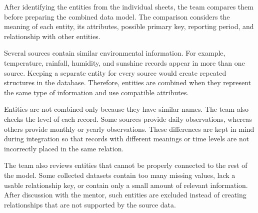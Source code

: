 \label{subsec:entity-integration}

After identifying the entities from the individual sheets, the team compares
them before preparing the combined data model. The comparison considers the
meaning of each entity, its attributes, possible primary key, reporting period,
and relationship with other entities.

Several sources contain similar environmental information. For example,
temperature, rainfall, humidity, and sunshine records appear in more than one
source. Keeping a separate entity for every source would create repeated
structures in the database. Therefore, entities are combined when they
represent the same type of information and use compatible attributes.

Entities are not combined only because they have similar names. The team also
checks the level of each record. Some sources provide daily observations,
whereas others provide monthly or yearly observations. These differences are
kept in mind during integration so that records with different meanings or time
levels are not incorrectly placed in the same relation.

The team also reviews entities that cannot be properly connected to the rest
of the model. Some collected datasets contain too many missing values, lack a
usable relationship key, or contain only a small amount of relevant
information. After discussion with the mentor, such entities are excluded
instead of creating relationships that are not supported by the source data.

